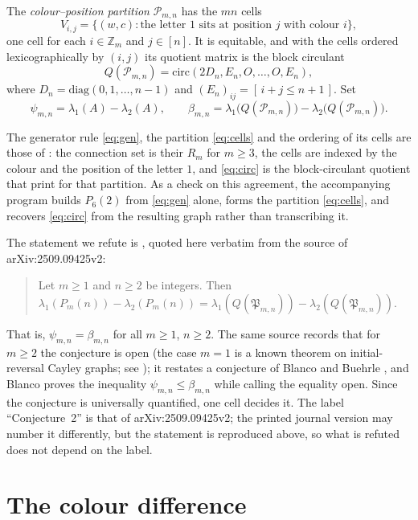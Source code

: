 \documentclass[11pt]{amsart}
\theoremstyle{remark}
\newcommand{\PP}{\mathcal P}
\newcommand{\Zm}{\mathbb Z_m}
\newcommand{\lam}{\lambda}
\begin{document}
The \emph{colour--position partition} $\PP_{m,n}$ has the $mn$ cells
\begin{equation}\label{eq:cells}
 V_{i,j}=\bigl\{(w,c):\text{the letter }1\text{ sits at position }j
 \text{ with colour }i\bigr\},
\end{equation}
one cell for each $i\in\Zm$ and $j\in[n]$.
It is equitable, and with the cells ordered lexicographically by $(i,j)$ its quotient matrix
is the block circulant
\begin{equation}\label{eq:circ}
 Q(\PP_{m,n})=\mathrm{circ}(2D_n,E_n,O,\dots,O,E_n),
\end{equation}
where $D_n=\mathrm{diag}(0,1,\dots,n-1)$ and $(E_n)_{ij}=[\,i+j\le n+1\,]$. Set
\[
 \psi_{m,n}=\lam_1(A)-\lam_2(A),
 \qquad
 \beta_{m,n}=\lam_1\bigl(Q(\PP_{m,n})\bigr)-\lam_2\bigl(Q(\PP_{m,n})\bigr).
\]

The generator rule \eqref{eq:gen}, the partition \eqref{eq:cells} and the ordering of its
cells are those of \cite{GZ}: the connection set is their $R_m$ for $m\ge3$, the cells are
indexed by the colour and the position of the letter $1$, and \eqref{eq:circ} is the
block-circulant quotient that \cite{GZ} print for that partition. As a check on this
agreement, the accompanying program builds $P_6(2)$ from \eqref{eq:gen} alone, forms the
partition \eqref{eq:cells}, and recovers \eqref{eq:circ} from the resulting graph rather than
transcribing it.

The statement we refute is \cite[Conjecture~2]{GZ}, quoted here verbatim from the source of
arXiv:2509.09425v2:

\begin{quote}
Let $m\ge1$ and $n\ge2$ be integers. Then
$\lam_1(P_m(n))-\lam_2(P_m(n))=\lam_1(Q(\mathfrak P_{m,n}))-\lam_2(Q(\mathfrak P_{m,n}))$.
\end{quote}

\noindent
That is, $\psi_{m,n}=\beta_{m,n}$ for all $m\ge1$, $n\ge2$. The same source records that for
$m\ge2$ the conjecture is open (the case $m=1$ is a known theorem on initial-reversal Cayley
graphs; see \cite{GZ,Bl}); it restates a conjecture of Blanco and Buehrle \cite{BB}, and
Blanco \cite{Bl} proves the inequality $\psi_{m,n}\le\beta_{m,n}$ while calling the equality
open. Since the conjecture is universally quantified, one cell decides it. The label
``Conjecture~2'' is that of arXiv:2509.09425v2; the printed journal version may number it
differently, but the statement is reproduced above, so what is refuted does not depend on the
label.

\section{The colour difference}
\end{document}
